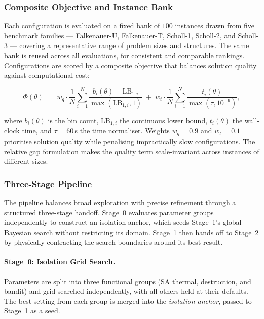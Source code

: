 \documentclass[conference]{IEEEtran}
\begin{document}
\subsubsection{Composite Objective and Instance Bank}

Each configuration is evaluated on a fixed bank of $100$ instances drawn from
five benchmark families --- Falkenauer-U, Falkenauer-T, Scholl-1, Scholl-2, and
Scholl-3 --- covering a representative range of problem sizes and structures.
The same bank is reused across all evaluations, for consistent and comparable rankings.
Configurations are scored by a composite objective that balances solution quality against computational cost:

\begin{equation}
	\label{eq:composite}
	\Phi(\theta) \;=\;
	w_q \cdot \frac{1}{N}\sum_{i=1}^{N}
	\frac{b_i(\theta) - \mathrm{LB}_{1,i}}{\max(\mathrm{LB}_{1,i},1)}
	\;+\;
	w_t \cdot \frac{1}{N}\sum_{i=1}^{N}
	\frac{t_i(\theta)}{\max(\tau,10^{-9})},
\end{equation}

\noindent where $b_i(\theta)$ is the bin count, $\mathrm{LB}_{1,i}$ the continuous lower bound, $t_i(\theta)$
the wall-clock time, and $\tau=60$\,s the time normaliser. Weights $w_q=0.9$ and $w_t=0.1$ prioritise solution
quality while penalising impractically slow configurations. The relative gap formulation makes the quality
term scale-invariant across instances of different sizes.


\subsubsection{Three-Stage Pipeline}

The pipeline balances broad exploration with precise refinement through a structured
three-stage handoff. Stage~0 evaluates parameter groups independently to construct
an isolation anchor, which seeds Stage~1's global Bayesian search without restricting
its domain. Stage~1 then hands off to Stage~2 by physically contracting the search
boundaries around its best result.

\paragraph{Stage~0: Isolation Grid Search.}
Parameters are split into three functional groups (SA thermal, destruction, and bandit)
and grid-searched independently, with all others held at their defaults. The best
setting from each group is merged into the \emph{isolation anchor}, passed to Stage~1
as a seed.
\end{document}
